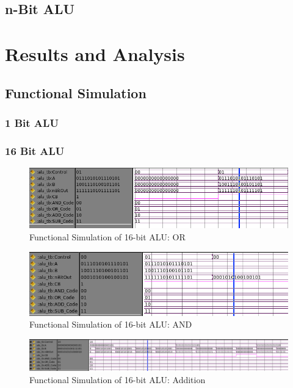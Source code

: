 \documentclass[11pt]{article}
\begin{document}
	\subsection{n-Bit ALU}


\section{Results and Analysis}

	\subsection{Functional Simulation}
	
		\subsubsection{1 Bit ALU}
	
		\subsubsection{16 Bit ALU}
		
			\begin{figure}[H]
				\centering
				\includegraphics[width=0.7\linewidth]{"Pictures/16 Bit ALU OR"}
				\caption{Functional Simulation of 16-bit ALU: OR}
				\label{fig:16-bit-alu-or}
			\end{figure}
			
			\begin{figure}[H]
				\centering
				\includegraphics[width=0.7\linewidth]{"Pictures/16 Bit ALU AND"}
				\caption{Functional Simulation of 16-bit ALU: AND}
				\label{fig:16-bit-alu-and}
			\end{figure}
		
			\begin{figure}[H]
				\centering
				\includegraphics[width=0.7\linewidth]{"Pictures/16 Bit ALU Add"}
				\caption{Functional Simulation of 16-bit ALU: Addition}
				\label{fig:16-bit-alu-add}
			\end{figure}
\end{document}
